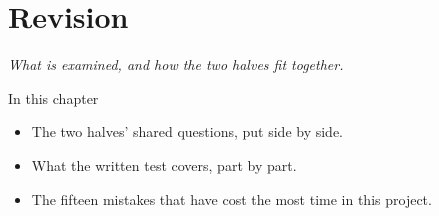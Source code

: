 \chapter{Revision}
\label{ch:repetition}


{\large\itshape What is examined, and how the two halves fit together.\par}

\begin{chapterbox}{In this chapter}
\begin{itemize}
  \item The two halves' shared questions, put side by side.
  \item What the written test covers, part by part.
  \item The fifteen mistakes that have cost the most time in this project.
\end{itemize}
\end{chapterbox}



